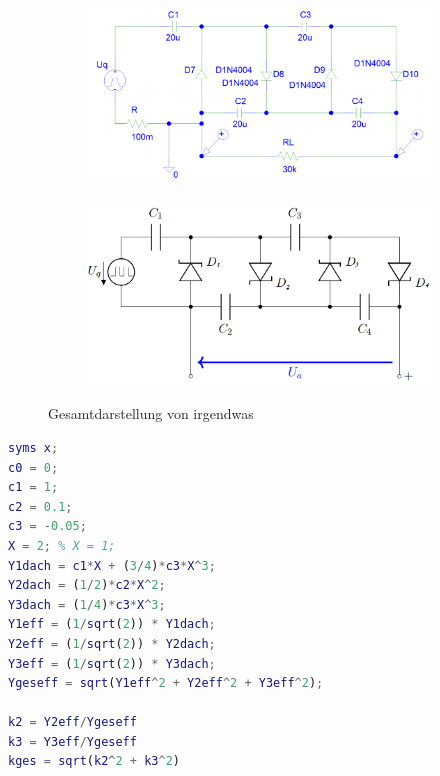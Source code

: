 \documentclass[
12pt,
a4paper,
headings=small,                    %
bibliography=totoc,                %
listof=totoc,                      %
parskip=half*,                     %
]{scrartcl}                        %
\begin{document}
\begin{figure}[H]
    \centering
    \begin{subfigure}[b]{0.45\textwidth} %
        \includegraphics[width=\textwidth]{psch_kaskade}
        \label{psch_kaskade}
    \end{subfigure}
    \hfill %
    \begin{subfigure}[b]{0.45\textwidth}
        \includegraphics[width=\textwidth]{schaltung}
        \label{kaskadenschaltung_2}
    \end{subfigure}
    \caption{Gesamtdarstellung von irgendwas}
\end{figure}

\begin{lstlisting}[language=matlab]
syms x;
c0 = 0;
c1 = 1;
c2 = 0.1;
c3 = -0.05;
X = 2; % X = 1;
Y1dach = c1*X + (3/4)*c3*X^3;
Y2dach = (1/2)*c2*X^2;
Y3dach = (1/4)*c3*X^3;
Y1eff = (1/sqrt(2)) * Y1dach;
Y2eff = (1/sqrt(2)) * Y2dach;
Y3eff = (1/sqrt(2)) * Y3dach;
Ygeseff = sqrt(Y1eff^2 + Y2eff^2 + Y3eff^2);

k2 = Y2eff/Ygeseff
k3 = Y3eff/Ygeseff
kges = sqrt(k2^2 + k3^2)

\end{lstlisting}
\end{document}
